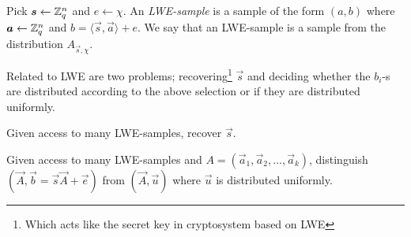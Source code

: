     \begin{definition}
        Pick \(\boldsymbol{s}\leftarrow\mathbb{Z}_q^n\) and \(e\leftarrow\chi\). An \emph{LWE-sample} is a sample of the form \((a, b)\) where \(\boldsymbol{a}\leftarrow\mathbb{Z}_q^n\) and \( b = \langle \vec{s}, \vec{a}\rangle + e\). We say that an LWE-sample is a sample from the distribution \(A_{\vec{s}, \chi}\).
    \end{definition}
    Related to LWE are two problems; recovering\footnote[2]{Which acts like the secret key in cryptosystem based on LWE} \(\vec{s}\) and deciding whether the \(b_i\)-s are distributed according to the above selection  or if they are distributed uniformly.
    \begin{definition}
        Given access to many LWE-samples, recover \(\vec{s}\).
    \end{definition}
    
    \begin{definition}
       Given access to many LWE-samples and \(A = (\vec{a}_1, \vec{a}_2,\dots ,\vec{a}_k)\), distinguish \((\vec{A}, \vec{b} = \vec{s}\vec{A} + \vec{e})\) from \((\vec{A}, \vec{u})\) where \(\vec{u}\) is distributed uniformly.
    \end{definition}
    
